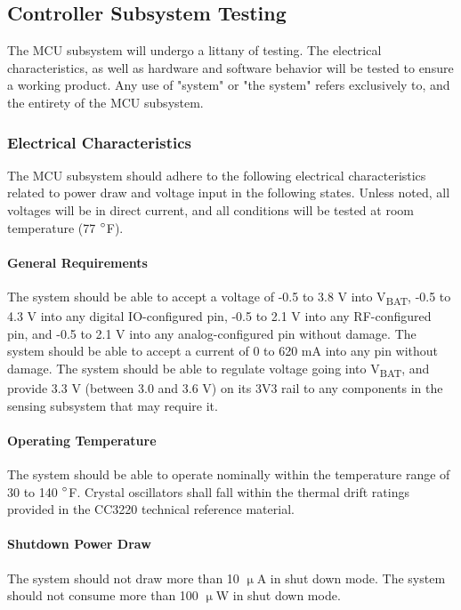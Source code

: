 \subsection{Controller Subsystem Testing}
\label{sec:controller_subsystem_testing}
The MCU subsystem will undergo a littany of testing. The electrical
characteristics, as well as hardware and software behavior will be tested to
ensure a working product. Any use of "system" or "the system" refers
exclusively to, and the entirety of the MCU subsystem.

\subsubsection{Electrical Characteristics}
The MCU subsystem should adhere to the following electrical characteristics
related to power draw and voltage input in the following states. Unless noted,
all voltages will be in direct current, and all conditions will be tested at
room temperature (77 $\degree$F). 

\paragraph{General Requirements} The system should be able to accept a voltage
of -0.5 to 3.8 V into V\textsubscript{BAT}, -0.5 to 4.3 V into any digital
IO-configured pin, -0.5 to 2.1 V into any RF-configured pin, and -0.5 to 2.1 V
into any analog-configured pin without damage. The system should be able to
accept a current of 0 to 620 mA into any pin without damage. The system should
be able to regulate voltage going into V\textsubscript{BAT}, and provide 3.3 V
(between 3.0 and 3.6 V) on its 3V3 rail to any components in the sensing
subsystem that may require it.

\paragraph{Operating Temperature} The system should be able to operate
nominally within the temperature range of 30 to 140 $\degree$F. Crystal
oscillators shall fall within the thermal drift ratings provided in the
CC3220 technical reference material.

\paragraph{Shutdown Power Draw} The system should not draw more than 10
$\upmu$A in shut down mode. The system should not consume more than 100
$\upmu$W in shut down mode.

